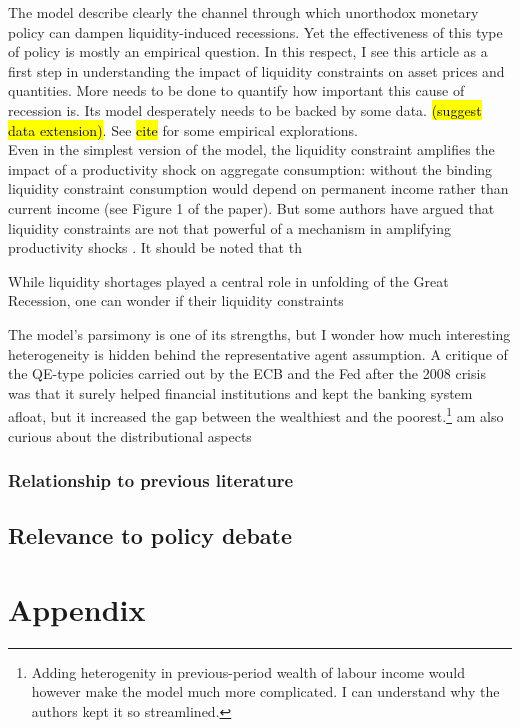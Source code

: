 \documentclass{amsart}
\theoremstyle{definition}
\theoremstyle{remark}
\numberwithin{equation}{section}
\begin{document}
The model describe clearly the channel through which unorthodox monetary policy can dampen liquidity-induced recessions. Yet the effectiveness of this type of policy is mostly an empirical question. In this respect, I see this article as a first step in understanding the impact of liquidity constraints on asset prices and quantities. More needs to be done to quantify how important this cause of recession is. Its model desperately needs to be backed by some data. \hl{(suggest data extension)}. See \hl{cite} for some empirical explorations.\\

Even in the simplest version of the model, the liquidity constraint amplifies the impact of a productivity shock on aggregate consumption: without the binding liquidity constraint consumption would depend on permanent income rather than current income (see Figure 1 of the paper). But some authors have argued that liquidity constraints are not that powerful of a mechanism in amplifying productivity shocks \citep{cordoba2004credit}. It should be noted that th

While liquidity shortages played a central role in unfolding of the Great Recession, one can wonder if their  liquidity constraints

The model's parsimony is one of its strengths, but I wonder how much interesting heterogeneity is hidden behind the representative agent assumption. A critique of the QE-type policies carried out by the ECB and the Fed after the 2008 crisis was that it surely helped financial institutions and kept the banking system afloat, but it increased the gap between the wealthiest and the poorest.\footnote{Adding heterogenity in previous-period wealth of labour income would however make the model much more complicated. I can understand why the authors kept it so streamlined.}
am also curious about the distributional aspects 

\subsubsection{Relationship to previous literature}

\subsection*{Relevance to policy debate}

\newpage




\newpage

\section*{Appendix}
\end{document}
